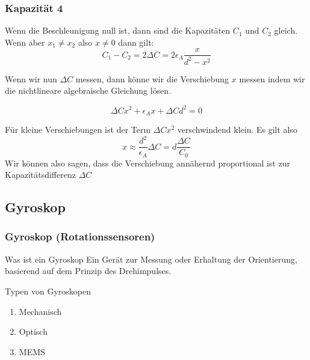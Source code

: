 \documentclass[10pt,a4paper,oneside]{beamer}
\begin{document}
\begin{frame}
	\frametitle{Kapazität 4}
	
	Wenn die Beschleunigung null ist, dann sind die Kapazitäten $C_{1}$ und $C_{2}$ gleich.
	Wenn aber $x_{1} \neq x_{2}$ also $x \neq 0$ dann gilt:
	\begin{equation}
		C_{1} - C_{2} = 2 \Delta C = 2 \epsilon_{A} \frac{x}{d^{2}-x^{2}}
	\end{equation}
	
	Wenn wir nun $\Delta C$ messen, dann könne wir die Verschiebung $x$ messen indem wir die nichtlineare algebraische Gleichung lösen.
	
	\begin{equation}
		\Delta C x^{2} + \epsilon_{A} x + \Delta C d^{2} = 0
	\end{equation}
	
	Für kleine Verschiebungen ist der Term $\Delta C x^{2}$ verschwindend klein. Es gilt also
	\begin{equation}
		x \approx \frac{d^{2}}{\epsilon_{A}} \Delta C = d \frac{\Delta C}{C_{0}}
	\end{equation}
	Wir können also sagen, dass die Verschiebung annähernd proportional ist zur Kapazitätsdifferenz $\Delta C$
\end{frame}

\begin{frame}
  \subsection{Gyroskop}
  \frametitle{Gyroskop (Rotationssensoren)}
  
  \begin{block}{Was ist ein Gyroskop}
  	Ein Gerät zur Messung oder Erhaltung der Orientierung, basierend auf dem Prinzip des Drehimpulses.
  \end{block}
  
  \bigskip
  
  Typen von Gyroskopen
  \begin{enumerate}
  	\item Mechanisch
  	\item Optisch 
  	\item MEMS
  \end{enumerate}
\end{frame}
\end{document}
